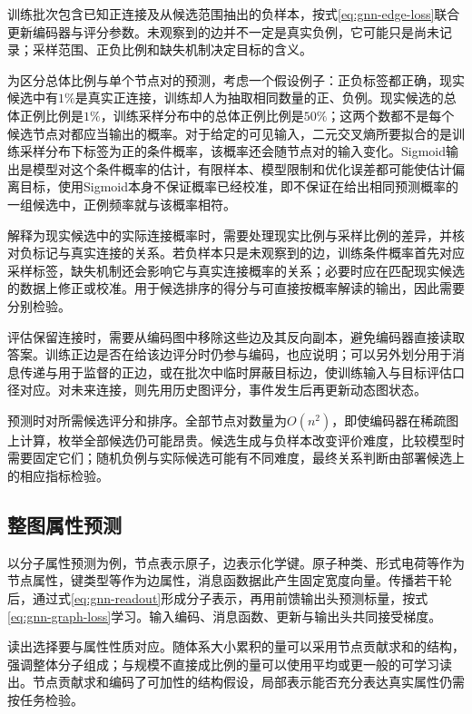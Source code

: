 训练批次包含已知正连接及从候选范围抽出的负样本，按式\eqref{eq:gnn-edge-loss}联合更新编码器与评分参数。未观察到的边并不一定是真实负例，它可能只是尚未记录；采样范围、正负比例和缺失机制决定目标的含义。

为区分总体比例与单个节点对的预测，考虑一个假设例子：正负标签都正确，现实候选中有$1\%$是真实正连接，训练却人为抽取相同数量的正、负例。现实候选的总体正例比例是$1\%$，训练采样分布中的总体正例比例是$50\%$；这两个数都不是每个候选节点对都应当输出的概率。对于给定的可见输入，二元交叉熵所要拟合的是训练采样分布下标签为正的条件概率，该概率还会随节点对的输入变化。Sigmoid输出是模型对这个条件概率的估计，有限样本、模型限制和优化误差都可能使估计偏离目标，使用Sigmoid本身不保证概率已经校准，即不保证在给出相同预测概率的一组候选中，正例频率就与该概率相符。

解释为现实候选中的实际连接概率时，需要处理现实比例与采样比例的差异，并核对负标记与真实连接的关系。若负样本只是未观察到的边，训练条件概率首先对应采样标签，缺失机制还会影响它与真实连接概率的关系；必要时应在匹配现实候选的数据上修正或校准。用于候选排序的得分与可直接按概率解读的输出，因此需要分别检验。

评估保留连接时，需要从编码图中移除这些边及其反向副本，避免编码器直接读取答案。训练正边是否在给该边评分时仍参与编码，也应说明；可以另外划分用于消息传递与用于监督的正边，或在批次中临时屏蔽目标边，使训练输入与目标评估口径对应。对未来连接，则先用历史图评分，事件发生后再更新动态图状态。

预测时对所需候选评分和排序。全部节点对数量为$O(n^2)$，即使编码器在稀疏图上计算，枚举全部候选仍可能昂贵。候选生成与负样本改变评价难度，比较模型时需要固定它们；随机负例与实际候选可能有不同难度，最终关系判断由部署候选上的相应指标检验。

\subsection{整图属性预测}
\label{sec:gnn-application-graph}

以分子属性预测为例，节点表示原子，边表示化学键。原子种类、形式电荷等作为节点属性，键类型等作为边属性，消息函数据此产生固定宽度向量。传播若干轮后，通过式\eqref{eq:gnn-readout}形成分子表示，再用前馈输出头预测标量，按式\eqref{eq:gnn-graph-loss}学习。输入编码、消息函数、更新与输出头共同接受梯度。

读出选择要与属性性质对应。随体系大小累积的量可以采用节点贡献求和的结构，强调整体分子组成；与规模不直接成比例的量可以使用平均或更一般的可学习读出。节点贡献求和编码了可加性的结构假设，局部表示能否充分表达真实属性仍需按任务检验。

